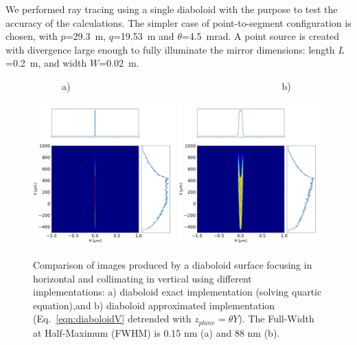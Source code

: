 \documentclass{iucr}              %
\begin{document}
We performed ray tracing using a single diaboloid with the purpose to test the accuracy of the calculations. The simpler case of point-to-segment configuration is chosen, with $p$=29.3~m, $q$=19.53~m and $\theta$=4.5~mrad. A point source is created with divergence large enough to fully illuminate the mirror dimensions: length $L$=0.2~m, and width $W$=0.02~m.

\begin{figure}\label{fig:pointToSegment}
\flushleft
~~~~~~a)~~~~~~~~~~~~~~~~~~~~~~~~~~~~~~~~~~~~~~~~~~~~b)\\
\centering

\includegraphics[width=0.49\textwidth]{figures/p2s_V_z.png}
\includegraphics[width=0.49\textwidth]{figures/p2s_K_z.png} \\
\flushleft
\caption{Comparison of images produced by a diaboloid surface focusing in horizontal and collimating in vertical using different implementations: a) diaboloid exact implementation (solving quartic equation),and b) diaboloid approximated implementation (Eq.~\ref{eqn:diaboloidV} detrended with $z_{plane}=\theta Y$).
The Full-Width at Half-Maximum (FWHM) is 0.15 nm (a) and 88 nm (b). %
}
\end{figure}
\end{document}
